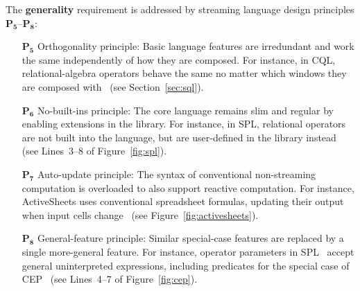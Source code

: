 The \textbf{generality} requirement is addressed by streaming language
design principles $\mathbf{P_5}$--$\mathbf{P_8}$:
\begin{itemize}
  \item[$\mathbf{P_5}$] Orthogonality principle: Basic language
    features are irredundant and work the same independently of how
    they are composed. For instance, in CQL, relational-algebra
    operators behave the same no matter which windows they are
    composed with~\cite{arasu_babu_widom_2006} (see
    Section~\ref{sec:sql}).
  \item[$\mathbf{P_6}$] No-built-ins principle: The core language
    remains slim and regular by enabling extensions in the library. For
    instance, in SPL, relational operators are not built into the
    language, but are user-defined in the library
    instead~\cite{hirzel_schneider_gedik_2017} (see \mbox{Lines 3--8}
    of Figure~\ref{fig:spl}).
  \item[$\mathbf{P_7}$] Auto-update principle: The syntax of
    conventional non-streaming computation is overloaded to also
    support reactive computation. For instance, ActiveSheets uses
    conventional spreadsheet formulas, updating their output when
    input cells change~\cite{vaziri_et_al_2014} (see
    Figure~\ref{fig:activesheets}).
  \item[$\mathbf{P_8}$] General-feature principle: Similar
    special-case features are replaced by a single more-general
    feature. For instance, operator parameters in
    SPL~\cite{hirzel_schneider_gedik_2017} accept general
    uninterpreted expressions, including predicates for the special
    case of CEP~\cite{hirzel_2012} (see \mbox{Lines 4--7} of
    Figure~\ref{fig:cep}).
\end{itemize}

